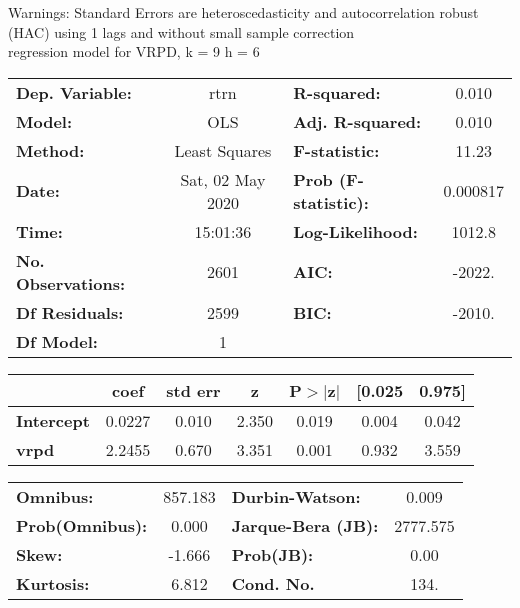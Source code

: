 Warnings: \newline
 [1] Standard Errors are heteroscedasticity and autocorrelation robust (HAC) using 1 lags and without small sample correction\\ 

regression model for VRPD, k = 9 h = 6\begin{center}
\begin{tabular}{lclc}
\toprule
\textbf{Dep. Variable:}    &       rtrn       & \textbf{  R-squared:         } &     0.010   \\
\textbf{Model:}            &       OLS        & \textbf{  Adj. R-squared:    } &     0.010   \\
\textbf{Method:}           &  Least Squares   & \textbf{  F-statistic:       } &     11.23   \\
\textbf{Date:}             & Sat, 02 May 2020 & \textbf{  Prob (F-statistic):} &  0.000817   \\
\textbf{Time:}             &     15:01:36     & \textbf{  Log-Likelihood:    } &    1012.8   \\
\textbf{No. Observations:} &        2601      & \textbf{  AIC:               } &    -2022.   \\
\textbf{Df Residuals:}     &        2599      & \textbf{  BIC:               } &    -2010.   \\
\textbf{Df Model:}         &           1      & \textbf{                     } &             \\
\bottomrule
\end{tabular}
\begin{tabular}{lcccccc}
                   & \textbf{coef} & \textbf{std err} & \textbf{z} & \textbf{P$> |$z$|$} & \textbf{[0.025} & \textbf{0.975]}  \\
\midrule
\textbf{Intercept} &       0.0227  &        0.010     &     2.350  &         0.019        &        0.004    &        0.042     \\
\textbf{vrpd}      &       2.2455  &        0.670     &     3.351  &         0.001        &        0.932    &        3.559     \\
\bottomrule
\end{tabular}
\begin{tabular}{lclc}
\textbf{Omnibus:}       & 857.183 & \textbf{  Durbin-Watson:     } &    0.009  \\
\textbf{Prob(Omnibus):} &   0.000 & \textbf{  Jarque-Bera (JB):  } & 2777.575  \\
\textbf{Skew:}          &  -1.666 & \textbf{  Prob(JB):          } &     0.00  \\
\textbf{Kurtosis:}      &   6.812 & \textbf{  Cond. No.          } &     134.  \\
\bottomrule
\end{tabular}
\end{center}

